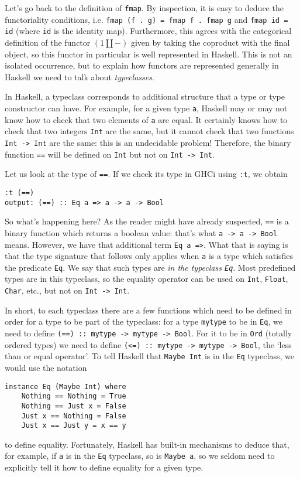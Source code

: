 \documentclass[11pt]{article}
\theoremstyle{nonumberplain}
\newcommand{\blank}{{-}}
\newcommand*\lsin{\lstinline}
\begin{document}
Let's go back to the definition of \lsin|fmap|. By inspection, it is easy to deduce the functoriality conditions, i.e. \lsin|fmap (f . g) = fmap f . fmap g| and \lsin|fmap id = id| (where \lsin|id| is the identity map). Furthermore, this agrees with the categorical definition of the functor $(1 \amalg \blank)$ given by taking the coproduct with the final object, so this functor in particular is well represented in Haskell. This is not an isolated occurrence, but to explain how functors are represented generally in Haskell we need to talk about \emph{typeclasses}.

In Haskell, a typeclass corresponds to additional structure that a type or type constructor can have. For example, for a given type \lsin|a|, Haskell may or may not know how to check that two elements of \lsin|a| are equal. It certainly knows how to check that two integers \lsin|Int| are the same, but it cannot check that two functions \lsin|Int -> Int| are the same: this is an undecidable problem! Therefore, the binary function \lsin|==| will be defined on \lsin|Int| but not on \lsin|Int -> Int|.

Let us look at the type of \lsin|==|. If we check its type in GHCi using \lsin|:t|, we obtain
\begin{lstlisting}
:t (==)
output: (==) :: Eq a => a -> a -> Bool
\end{lstlisting}

So what's happening here? As the reader might have already suspected, \lsin|==| is a binary function which returns a boolean value: that's what \lsin|a -> a -> Bool| means. However, we have that additional term \lsin|Eq a =>|. What that is saying is that the type signature that follows only applies when \lsin|a| is a type which satisfies the predicate \lsin|Eq|. We say that such types are \emph{in the typeclass \lsin|Eq|}. Most predefined types are in this typeclass, so the equality operator can be used on \lsin|Int|, \lsin|Float|, \lsin|Char|, etc., but not on \lsin|Int -> Int|.

In short, to each typeclass there are a few functions which need to be defined in order for a type to be part of the typeclass: for a type \lsin|mytype| to be in \lsin|Eq|, we need to define \lsin|(==) :: mytype -> mytype -> Bool|. For it to be in \lsin|Ord| (totally ordered types) we need to define \lsin|(<=) :: mytype -> mytype -> Bool|, the `less than or equal operator'. To tell Haskell that \lsin|Maybe Int| is in the \lsin|Eq| typeclass, we would use the notation
\begin{lstlisting}
instance Eq (Maybe Int) where
    Nothing == Nothing = True
    Nothing == Just x = False
    Just x == Nothing = False
    Just x == Just y = x == y
\end{lstlisting}
to define equality. Fortunately, Haskell has built-in mechanisms to deduce that, for example, if \lsin|a| is in the \lsin|Eq| typeclass, so is \lsin|Maybe a|, so we seldom need to explicitly tell it how to define equality for a given type.
\end{document}
